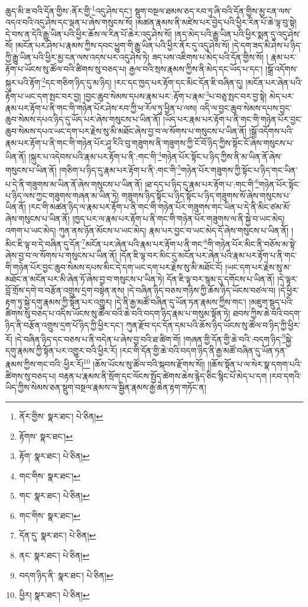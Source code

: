 ཆུད་མི་ཟ་བའི་དོན་གྱིས་:ནོར་གྱི་\footnote{ནོར་གྱིས་  སྣར་ཐང་།  པེ་ཅིན། }འདུ་ཤེས་དང་། སྡུག་བསྔལ་ཐམས་ཅད་རབ་ཏུ་ཞི་བའི་དོན་གྱིས་མྱ་ངན་ལས་འདའ་བའི་འདུ་ཤེས་དང་ལྡན་པ་ཞེས་གསུངས་སོ། །མཚན་རྣམས་ནི་མཛེས་པར་བྱེད་པའི་ཕྱིར་རིན་པོ་ཆེ་ལྟ་བུ་སྟེ། དེ་བས་ན་དེའི་རྒྱུ་ཡིན་པའི་ཕྱིར་ཆོས་ལ་རིན་པོ་ཆེར་འདུ་ཤེས་སོ། །ནད་མེད་པའི་རྒྱུ་ཡིན་པའི་ཕྱིར་སྨན་དུ་འདུ་ཤེས་སོ། །མངོན་པར་ཤེས་པ་རྣམས་ཀྱིས་དབང་ཕྱུག་གི་རྒྱུ་ཡིན་པའི་ཕྱིར་ནོར་དུ་འདུ་ཤེས་སོ། །དེ་དག་ཟད་མི་ཤེས་པ་ཉིད་ཀྱི་རྒྱུ་ཡིན་པའི་ཕྱིར་མྱ་ངན་ལས་འདས་པར་འདུ་ཤེས་ཏེ། ཟད་པས་འཇིགས་པ་མེད་པའི་དོན་གྱིས་སོ། །
རྣམ་པར་རྟོག་པ་ཡོངས་སུ་ཚོལ་བའི་ཚིགས་སུ་བཅད་པ། རྒྱལ་བའི་སྲས་རྣམས་ཀྱིས་ནི་མེད་དང་ཡོད་པ་དང་། །སྒྲོ་འདོགས་སྐུར་པའི་རྟོག་\footnote{རྟོགས་  སྣར་ཐང་། }དང་གཅིག་ཉིད་དུ་མ་ཉིད། །རང་དང་ཁྱད་པར་རྟོག་དང་མིང་དོན་ཇི་བཞིན་དུ། །མངོན་པར་ཞེན་པའི་རྟོག་པ་ཡང་དག་སྤང་བར་བྱ། །བྱང་ཆུབ་སེམས་དཔས་རྣམ་པར་:རྟོག་པ་རྣམ་\footnote{རྟོག་  སྣར་ཐང་།  པེ་ཅིན། }པ་བཅུ་སྤང་བར་བྱ་སྟེ། མེད་པར་རྣམ་པར་རྟོག་པ་ནི་གང་གི་གཉེན་པོར་ཤེས་རབ་ཀྱི་ཕ་རོལ་ཏུ་ཕྱིན་པ་ལས། འདི་ལ་བྱང་ཆུབ་སེམས་དཔས་བྱང་ཆུབ་སེམས་དཔའ་ཉིད་དུ་ཡོད་པར་ཞེས་གསུངས་པ་ཡིན་ནོ། །ཡོད་པར་རྣམ་པར་རྟོག་པ་ནི་གང་གི་གཉེན་པོར་བྱང་ཆུབ་སེམས་དཔའ་ཡང་དག་པར་རྗེས་སུ་མི་མཐོང་ཞེས་བྱ་བ་ལ་སོགས་པ་གསུངས་པ་ཡིན་ནོ། །སྒྲོ་འདོགས་པའི་རྣམ་པར་རྟོག་པ་ནི་གང་གི་གཉེན་པོར་ཤཱ་རིའི་བུ་གཟུགས་ནི་གཟུགས་ཀྱི་ངོ་བོ་ཉིད་ཀྱིས་སྟོང་ངོ་ཞེས་གསུངས་པ་ཡིན་ནོ། །སྐུར་པ་འདེབས་པའི་རྣམ་པར་རྟོག་པ་ནི་:གང་གི་\footnote{གང་གིས་  སྣར་ཐང་། }གཉེན་པོར་སྟོང་པ་ཉིད་ཀྱིས་ནི་མ་ཡིན་ནོ་ཞེས་གསུངས་པ་ཡིན་ནོ། །གཅིག་པ་ཉིད་དུ་རྣམ་པར་རྟོག་པ་ནི་:གང་གི་\footnote{གང་  སྣར་ཐང་།  པེ་ཅིན། }གཉེན་པོར་གཟུགས་ཀྱི་སྟོང་པ་ཉིད་གང་ཡིན་པ་དེ་ནི་གཟུགས་མ་ཡིན་ནོ་ཞེས་གསུངས་པ་ཡིན་ནོ། །ཐ་དད་པ་ཉིད་དུ་རྣམ་པར་རྟོག་པ་:གང་གི་\footnote{གང་གིས་  སྣར་ཐང་། }གཉེན་པོར་སྟོང་པ་ཉིད་ལས་ཀྱང་གཟུགས་གཞན་མ་ཡིན་ཏེ། གཟུགས་ཉིད་སྟོང་པ་ཉིད་སྟོང་པ་ཉིད་གཟུགས་སོ་ཞེས་གསུངས་པ་ཡིན་ནོ། །རང་གི་མཚན་ཉིད་ལ་རྣམ་པར་རྟོག་པ་ནི་གང་གི་གཉེན་པོར་གཟུགས་གང་ཡིན་པ་དེ་ནི་མིང་ཙམ་མོ་ཞེས་གསུངས་པ་ཡིན་ནོ། །ཁྱད་པར་ལ་རྣམ་པར་རྟོག་པ་ནི་གང་གི་གཉེན་པོར་གཟུགས་ལ་ནི་སྐྱེ་བ་ཡང་མེད། འགག་པ་ཡང་མེད། ཀུན་ནས་ཉོན་མོངས་པ་ཡང་མེད། རྣམ་པར་བྱང་བ་ཡང་མེད་དོ་ཞེས་གསུངས་པ་ཡིན་ནོ། །མིང་ཇི་ལྟ་བ་དེ་བཞིན་དུ་དོན་\footnote{དོན་དུ་  སྣར་ཐང་།  པེ་ཅིན། }མངོན་པར་ཞེན་པའི་རྣམ་པར་རྟོག་པ་ནི་གང་\footnote{ནང་  སྣར་ཐང་།  པེ་ཅིན། }གི་གཉེན་པོར་མིང་ནི་བཅོས་མ་སྟེ་ཞེས་བྱ་བ་ལ་སོགས་པ་གསུངས་པ་ཡིན་ནོ། །དོན་ཇི་ལྟ་བར་མིང་དུ་མངོན་པར་ཞེན་པའི་རྣམ་པར་རྟོག་པ་ནི་གང་གི་གཉེན་པོར་བྱང་ཆུབ་སེམས་དཔས་མིང་དེ་དག་ཡང་དག་པར་རྗེས་སུ་མི་མཐོང་ངོ། །ཡང་དག་པར་རྗེས་སུ་མ་མཐོང་ན་མངོན་པར་མི་ཞེན་ཏོ་ཞེས་བྱ་བ་གསུངས་པ་ཡིན་ཏེ། དོན་ཇི་ལྟ་བར་སྙམ་དུ་དགོངས་པ་ཡིན་ནོ། །དེ་ལྟར་བློ་གྲོས་དགེ་བ་བརྩོན་འགྲུས་དྲག་བསྟེན་ནས། །དེ་བཞིན་ཉིད་བཅས་གཉིས་ཀྱི་ཆོས་ཉིད་ཡོངས་བཙལ་བ། །དེ་ཕྱིར་རྟག་ཏུ་སྐྱེ་དགུ་རྣམས་ཀྱི་སྟོན་པར་འགྱུར། །དེ་ནི་རྒྱ་མཚོ་བཞིན་དུ་ཡོན་ཏན་རྣམས་ཀྱིས་གང་། །མཇུག་སྡུད་པའི་ཚིགས་སུ་བཅད་པ་འདིས་ཡོངས་སུ་ཚོལ་བའི་ཆེ་བའི་བདག་ཉིད་རྣམ་པ་གསུམ་སྟོན་ཏེ། ཐབས་ཀྱིས་ཆེ་བའི་བདག་ཉིད་ནི་བརྩོན་འགྲུས་དྲག་པོ་ཉིད་ཀྱི་ཕྱིར་དང་། ཀུན་རྫོབ་དང་དོན་དམ་པའི་ཆོས་ཉིད་ཡོངས་སུ་ཚོལ་བ་ཉིད་ཀྱི་ཕྱིར་རོ། །དེ་བཞིན་ཉིད་དང་བཅས་པ་ནི་བདེན་པ་ཞེས་བྱ་བའི་ཐ་ཚིག་གོ། །གཞན་གྱི་དོན་གྱི་ཆེ་བའི་:བདག་ཉིད་\footnote{བདག་ཉིད་ནི་  སྣར་ཐང་།  པེ་ཅིན། }སྐྱེ་དགུ་རྣམས་ཀྱི་སྟོན་པར་འགྱུར་བའི་ཕྱིར་རོ། །རང་གི་དོན་གྱི་ཆེ་བའི་བདག་ཉིད་ནི་རྒྱ་མཚོ་བཞིན་དུ་ཡོན་ཏན་རྣམས་ཀྱིས་གང་བའི་:ཕྱིར་རོ།\footnote{ཕྱིར།  སྣར་ཐང་།  པེ་ཅིན། } །ཆོས་ཡོངས་སུ་ཚོལ་བའི་སྐབས་རྫོགས་སོ།། །།ཆོས་སྟོན་པ་ལ་སེར་སྣ་དགག་པའི་ཚིགས་སུ་བཅད་པ། བརྟན་པ་རྣམས་ནི་སྲོག་དང་ལོངས་སྤྱོད་ཚེགས་ཆེས་རྙེད་ཅིང་སྙིང་པོ་མེད་པ་དག །རབ་དགའི་ཡིད་ཀྱིས་སེམས་ཅན་སྡུག་བསྔལ་རྣམས་ལ་སྦྱིན་རྣམས་རྒྱ་ཆེན་རྟག་གཏོང་ན། 